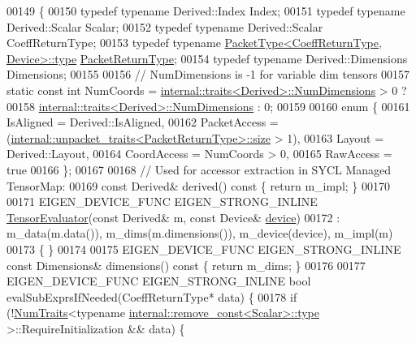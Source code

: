 \begin{DoxyCode}
00149 \{
00150   \textcolor{keyword}{typedef} \textcolor{keyword}{typename} Derived::Index Index;
00151   \textcolor{keyword}{typedef} \textcolor{keyword}{typename} Derived::Scalar Scalar;
00152   \textcolor{keyword}{typedef} \textcolor{keyword}{typename} Derived::Scalar CoeffReturnType;
00153   \textcolor{keyword}{typedef} \textcolor{keyword}{typename} \hyperlink{group___sparse_core___module}{PacketType<CoeffReturnType, Device>::type} 
      \hyperlink{group___sparse_core___module}{PacketReturnType};
00154   \textcolor{keyword}{typedef} \textcolor{keyword}{typename} Derived::Dimensions Dimensions;
00155 
00156   \textcolor{comment}{// NumDimensions is -1 for variable dim tensors}
00157   \textcolor{keyword}{static} \textcolor{keyword}{const} \textcolor{keywordtype}{int} NumCoords = \hyperlink{struct_eigen_1_1internal_1_1traits}{internal::traits<Derived>::NumDimensions}
       > 0 ?
00158                                \hyperlink{struct_eigen_1_1internal_1_1traits}{internal::traits<Derived>::NumDimensions}
       : 0;
00159 
00160   \textcolor{keyword}{enum} \{
00161     IsAligned = Derived::IsAligned,
00162     PacketAccess = (\hyperlink{struct_eigen_1_1internal_1_1unpacket__traits}{internal::unpacket\_traits<PacketReturnType>::size}
       > 1),
00163     Layout = Derived::Layout,
00164     CoordAccess = NumCoords > 0,
00165     RawAccess = \textcolor{keyword}{true}
00166   \};
00167 
00168   \textcolor{comment}{// Used for accessor extraction in SYCL Managed TensorMap:}
00169   \textcolor{keyword}{const} Derived& derived()\textcolor{keyword}{ const }\{ \textcolor{keywordflow}{return} m\_impl; \}
00170 
00171   EIGEN\_DEVICE\_FUNC EIGEN\_STRONG\_INLINE \hyperlink{struct_eigen_1_1_tensor_evaluator}{TensorEvaluator}(\textcolor{keyword}{const} Derived& m, \textcolor{keyword}{const} Device& 
      \hyperlink{struct_eigen_1_1_tensor_evaluator_a98b51809ed8f7a1f736eb7b952b9636e}{device})
00172       : m\_data(m.data()), m\_dims(m.dimensions()), m\_device(device), m\_impl(m)
00173   \{ \}
00174 
00175   EIGEN\_DEVICE\_FUNC EIGEN\_STRONG\_INLINE \textcolor{keyword}{const} Dimensions& dimensions()\textcolor{keyword}{ const }\{ \textcolor{keywordflow}{return} m\_dims; \}
00176 
00177   EIGEN\_DEVICE\_FUNC EIGEN\_STRONG\_INLINE \textcolor{keywordtype}{bool} evalSubExprsIfNeeded(CoeffReturnType* data) \{
00178     \textcolor{keywordflow}{if} (!\hyperlink{group___core___module_struct_eigen_1_1_num_traits}{NumTraits}<\textcolor{keyword}{typename} \hyperlink{group___sparse_core___module}{internal::remove\_const<Scalar>::type}
      >::RequireInitialization && data) \{

\end{DoxyCode}
